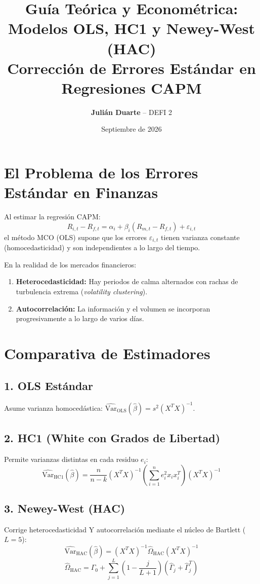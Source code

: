 \documentclass[11pt,a4paper]{article}
\title{\textbf{Guía Teórica y Econométrica: Modelos OLS, HC1 y Newey-West (HAC)}\\\large\textmd{Corrección de Errores Estándar en Regresiones CAPM}}
\author{\textbf{Julián Duarte} -- DEFI 2}
\date{Septiembre de 2026}
\begin{document}
\maketitle

\section{El Problema de los Errores Estándar en Finanzas}
Al estimar la regresión CAPM:
\begin{equation}
R_{i,t} - R_{f,t} = \alpha_i + \beta_i (R_{m,t} - R_{f,t}) + \varepsilon_{i,t}
\end{equation}
el método MCO (OLS) supone que los errores $\varepsilon_{i,t}$ tienen varianza constante (homocedasticidad) y son independientes a lo largo del tiempo.

En la realidad de los mercados financieros:
\begin{enumerate}
    \item \textbf{Heterocedasticidad:} Hay periodos de calma alternados con rachas de turbulencia extrema (\textit{volatility clustering}).
    \item \textbf{Autocorrelación:} La información y el volumen se incorporan progresivamente a lo largo de varios días.
\end{enumerate}

\section{Comparativa de Estimadores}
\subsection{1. OLS Estándar}
Asume varianza homocedástica: $\widehat{\text{Var}}_{\text{OLS}}(\hat{\beta}) = s^2 (X^T X)^{-1}$.

\subsection{2. HC1 (White con Grados de Libertad)}
Permite varianzas distintas en cada residuo $e_i$:
\begin{equation}
\widehat{\text{Var}}_{\text{HC1}}(\hat{\beta}) = \frac{n}{n-k} (X^T X)^{-1} \left( \sum_{i=1}^n e_i^2 x_i x_i^T \right) (X^T X)^{-1}
\end{equation}

\subsection{3. Newey-West (HAC)}
Corrige heterocedasticidad Y autocorrelación mediante el núcleo de Bartlett ($L=5$):
\begin{equation}
\widehat{\text{Var}}_{\text{HAC}}(\hat{\beta}) = (X^T X)^{-1} \hat{\Omega}_{\text{HAC}} (X^T X)^{-1}
\end{equation}
\begin{equation}
\hat{\Omega}_{\text{HAC}} = \hat{\Gamma}_0 + \sum_{j=1}^{L} \left(1 - \frac{j}{L+1}\right) (\hat{\Gamma}_j + \hat{\Gamma}_j^T)
\end{equation}
\end{document}
